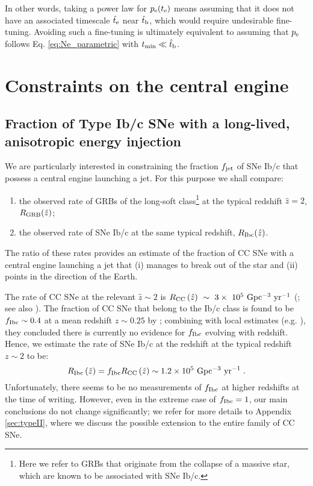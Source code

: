 \documentclass[useAMS,usenatbib]{mn2e}
\begin{document}
In other words, taking a power law for $p_{\rm e}\!\left(t_{\rm e}\right)$ means assuming that it does not have an associated timescale $\hat{t}_{\rm e}$ near $\hat{t}_{\rm b}$, which would require undesirable fine-tuning. Avoiding such a fine-tuning is ultimately equivalent to assuming that $p_{\rm e}$ follows Eq. \eqref{eq:Ne_parametric} with $t_{\rm min}\ll\hat{t}_{\rm b}$.


\section{Constraints on the central engine}
\label{sec:constraints}

\subsection{Fraction of Type Ib/c SNe with a long-lived, anisotropic energy injection}

We are particularly interested in constraining the fraction $f_{\rm jet}$ of SNe Ib/c that possess a central engine launching a jet. For this purpose we shall compare:
\begin{enumerate}
\item the observed rate of GRBs of the long-soft class\footnote{Here we refer to GRBs that originate from the collapse of a massive star, which are known to be associated with SNe Ib/c.} at the typical redshift $\hat{z}=2$, $R_{\rm GRB}(\hat{z})$;
\item the observed rate of SNe Ib/c at the same typical redshift, $R_{\rm Ibc}(\hat{z})$.
\end{enumerate}
The ratio of these rates provides an estimate of the fraction of CC SNe with a central engine launching a jet that (i) manages to break out of the star and (ii) points in the direction of the Earth.
 
The rate of CC SNe at the relevant $\hat{z}\sim 2$ is $R_{\rm CC}\left(\hat{z}\right)~\sim~3\times~10^5\text{ Gpc$^{-3}$ yr$^{-1}$}$ (\citealt{Strolger2015}; see also \citealt{Dahlen2004, Graur2011, Melinder2012, Dahlen2012, Cappellaro2015, Petrushevska2016}).
The fraction of CC SNe that belong to the Ib/c class is found to be $f_{\rm Ibc}\sim 0.4$ at a mean redshift $z\sim 0.25$ by \citet{Cappellaro2015}; combining with local estimates (e.g. \citealt{BoissierPrantzos2009,Li2011}), they concluded there is currently no evidence for $f_{\rm Ibc}$ evolving with redshift. Hence, we estimate the rate of SNe Ib/c at the redshift at the typical redshift $z\sim 2$ to be:
\begin{equation}
\label{eq:R_Ibc}
R_{\rm Ibc}\left(\hat{z}\right)=f_{\rm Ibc}R_{\rm CC}\left(\hat{z}\right)\sim 1.2\times 10^5\text{ Gpc$^{-3}$ yr$^{-1}$}\;.
\end{equation}
Unfortunately, there seems to be no measurements of $f_{\rm Ibc}$ at higher redshifts at the time of writing. However, even in the extreme case of $f_{\rm Ibc}=1$, our main conclusions do not change significantly; we refer for more details to Appendix \ref{sec:typeII}, where we discuss the possible extension to the entire family of CC SNe.
\end{document}
